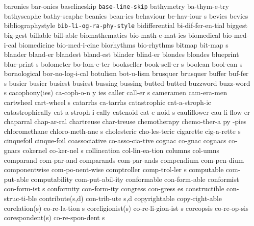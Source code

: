 \1 baronies		bar-onies
\1 baselineskip 	{\tt\bs base-line-skip}
\1 bathymetry		ba-thym-e-try
\1 bathyscaphe		bathy-scaphe
\1 beanies		bean-ies
\5 behaviour		be-hav-iour s
\1 bevies		bevies
\1 bibliographystyle	{\tt\bs bib-li-og-ra-phy-style}
\1 bidifferential	bi-dif-fer-en-tial
\1 biggest		big-gest
\1 billable		bill-able
\1 biomathematics	bio-math-e-mat-ics
\1 biomedical		bio-med-i-cal		%
\1 biomedicine		bio-med-i-cine
\1 biorhythms		bio-rhythms
\5 bitmap		bit-map s
\1 blander		bland-er
\1 blandest		bland-est
\1 blinder		blind-er
\1 blondes		blondes
\5 blueprint		blue-print s
\1 bolometer		bo-lom-e-ter
\5 bookseller		book-sell-er s		%
\5 boolean		bool-ean s		%
\1 bornological 	bor-no-log-i-cal
\1 botulism		bot-u-lism
\1 brusquer		brusquer
\5 buffer		buf-fer s		%
\1 busier		busier
\1 busiest		busiest
\1 bussing		bussing
\1 butted		butted
\5 buzzword		buzz-word s
\3 cacophony(ies)	ca-coph-o-n y ies
\5 caller		call-er s		%
\1 cameramen		cam-era-men
\5 cartwheel		cart-wheel s
\1 catarrhs		ca-tarrhs
\1 catastrophic		cat-a-stroph-ic
\1 catastrophically	cat-a-stroph-i-cally
\5 catenoid		cat-e-noid s		%
\1 cauliflower		cau-li-flow-er
\1 chaparral		chap-ar-ral
\1 chartreuse		char-treuse
\6 chemotherapy 	chemo-ther-a py -pies   %
\5 chloromethane	chloro-meth-ane s	%
\1 cholesteric		cho-les-teric
\5 cigarette		cig-a-rette s
\1 cinquefoil		cinque-foil
\1 coassociative	co-asso-cia-tive	%
\1 cognac		co-gnac
\1 cognacs		co-gnacs
\5 cokernel		co-ker-nel s		%
\1 collineation 	col-lin-ea-tion		%
\1 columns              col-umns             %
\1 comparand		com-par-and
\1 comparands		com-par-ands
\1 compendium		com-pen-dium         %
\1 componentwise	com-po-nent-wise     %
\5 comptroller		comp-trol-ler s
\1 computable		com-put-able		%
\1 computability	com-put-abil-ity	%
\1 conformable		con-form-able
\5 conformist		con-form-ist s
\1 conformity		con-form-ity
\5 congress		con-gress es
\1 constructible	con-struc-ti-ble	%
\2 contribute(s,d)	con-trib-ute s,d
\1 copyrightable	copy-right-able		%
\2 corelation(s)	co-re-la-tion s		%
\2 coreligionist(s)	co-re-li-gion-ist s	%
\1 coreopsis		co-re-op-sis		%
\2 corespondent(s)	co-re-spon-dent s	%
